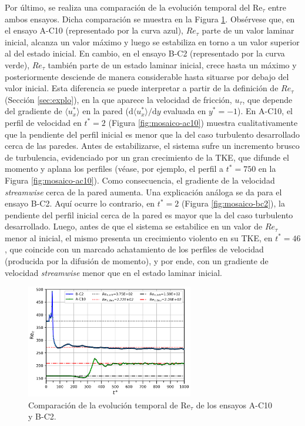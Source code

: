Por último, se realiza una comparación de la evolución temporal del Re$_{\tau}$ entre ambos ensayos. Dicha comparación se muestra en la Figura \ref{fig:retau-comp}. Obsérvese que, en el ensayo \linebreak A-C10 (representado por la curva azul), $Re_{\tau}$ parte de un valor laminar inicial, alcanza un valor máximo y luego se estabiliza en torno a un valor superior al del estado inicial. En cambio, en el ensayo B-C2 (representado por la curva verde), $Re_{\tau}$ también parte de un estado laminar inicial, crece hasta un máximo y posteriormente desciende de manera considerable hasta situarse por debajo del valor inicial. Esta diferencia se puede interpretar a partir de la definición de $Re_{\tau}$ (Sección \ref{sec:explo}), en la que aparece la velocidad de fricción, $u_{\tau}$, que depende del gradiente de $\langle u^*_x  \rangle$ en la pared ($\mathrm{d}\langle u^*_x \rangle/\mathrm{d}y$ evaluada en $y^*=-1$). En A-C10, el perfil de velocidad en $t^*=2$ (Figura \ref{fig:mosaico-ac10}) muestra cualitativamente que la pendiente del perfil inicial es menor que la del caso turbulento desarrollado cerca de las paredes. Antes de estabilizarse, el sistema sufre un incremento brusco de turbulencia, evidenciado por un gran crecimiento de la TKE, que difunde el momento y aplana los perfiles (véase, por ejemplo, el perfil a $t^*=750$ en la Figura \ref{fig:mosaico-ac10}). Como consecuencia, el gradiente de la velocidad \textit{streamwise} cerca de la pared aumenta. Una explicación análoga se da para el ensayo B-C2. Aquí ocurre lo contrario, en $t^*=2$ (Figura \ref{fig:mosaico-bc2}), la pendiente del perfil inicial cerca de la pared es mayor que la del caso turbulento desarrollado. Luego, antes de que el sistema se estabilice en un valor de $Re_{\tau}$ menor al inicial, el mismo presenta un crecimiento violento en su TKE, en $t^*=46$, que coincide con un marcado achatamiento de los perfiles de velocidad (producida por la difusión de momento), y por ende, con un gradiente de velocidad \textit{streamwise} menor que en el estado laminar inicial. 

\begin{figure}[H]
  \centering  
    \includegraphics[width=0.65\textwidth]{figures/cap6/comp_retau.png}
  \caption{Comparación de la evolución temporal de Re$_{\tau}$ de los ensayos A-C10 y B-C2.}
  \label{fig:retau-comp}
\end{figure}




